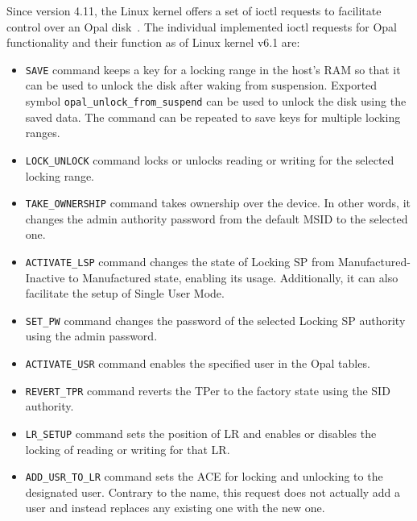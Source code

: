 Since version 4.11, the Linux kernel offers a set of ioctl requests to facilitate control over an Opal disk~\cite{linux-opal-introduction-mail}. 
The individual implemented ioctl requests for Opal functionality and their function as of Linux kernel v6.1 are:
\begin{itemize}
\item \verb|SAVE| command keeps a key for a locking range in the host's RAM so that it can be used to unlock the disk after waking from suspension. Exported symbol \verb|opal_unlock_from_suspend| can be used to unlock the disk using the saved data. The command can be repeated to save keys for multiple locking ranges. %
\item \verb|LOCK_UNLOCK| command locks or unlocks reading or writing for the selected locking range.
\item \verb|TAKE_OWNERSHIP| command takes ownership over the device. In other words, it changes the admin authority password from the default MSID to the selected one. 
\item \verb|ACTIVATE_LSP| command changes the state of Locking SP from Manufactured-Inactive to Manufactured state, enabling its usage. Additionally, it can also facilitate the setup of Single User Mode. 
\item \verb|SET_PW| command changes the password of the selected Locking SP authority using the admin password.
\item \verb|ACTIVATE_USR| command enables the specified user in the Opal tables.
\item \verb|REVERT_TPR| command reverts the TPer to the factory state using the SID authority.
\item \verb|LR_SETUP| command sets the position of LR and enables or disables the locking of reading or writing for that LR.
\item \verb|ADD_USR_TO_LR| command sets the ACE for locking and unlocking to the designated user. Contrary to the name, this request does not actually add a user and instead replaces any existing one with the new one. %

\end{itemize}
